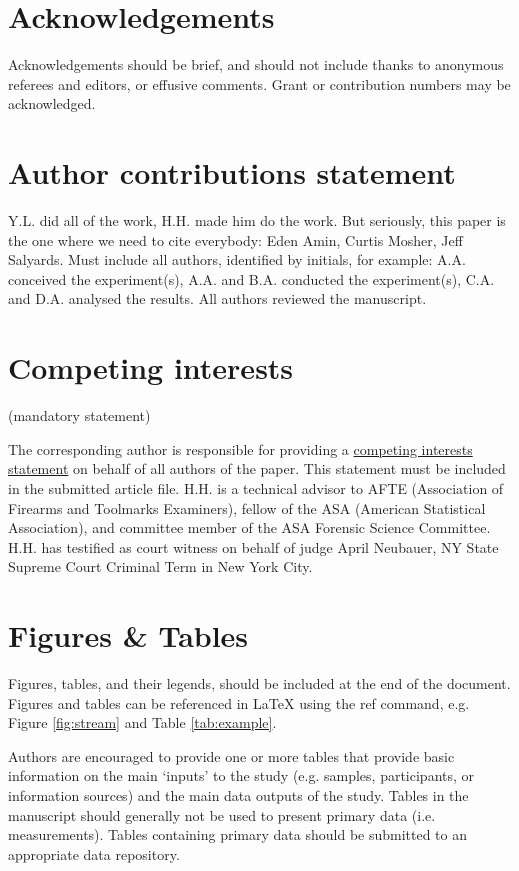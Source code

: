 \documentclass[fleqn,10pt]{wlscirep}
\begin{document}
\section*{Acknowledgements} 
Acknowledgements should be brief, and should not include thanks to
anonymous referees and editors, or effusive comments. Grant or
contribution numbers may be acknowledged.

\section*{Author contributions statement}

Y.L. did all of the work, H.H. made him do the work. But seriously, this
paper is the one where we need to cite everybody: Eden Amin, Curtis
Mosher, Jeff Salyards.
Must include all authors, identified by initials, for example:
A.A. conceived the experiment(s), A.A. and B.A. conducted the experiment(s), C.A. and D.A. analysed the results. All authors reviewed the manuscript. 

\section*{Competing interests} (mandatory statement)

The corresponding author is responsible for providing a
\href{https://www.nature.com/sdata/policies/editorial-and-publishing-policies#competing}{competing interests statement}
on behalf of all authors of the paper. This statement must be included
in the submitted article file. H.H. is a technical advisor to AFTE
(Association of Firearms and Toolmarks Examiners), fellow of the ASA
(American Statistical Association), and committee member of the ASA
Forensic Science Committee. H.H. has testified as court witness on
behalf of judge April Neubauer, NY State Supreme Court Criminal Term in
New York City.

\section*{Figures \& Tables}


Figures, tables, and their legends, should be included at the end of the document. Figures and tables can be referenced in \LaTeX{} using the ref command, e.g. Figure \ref{fig:stream} and Table \ref{tab:example}. 

Authors are encouraged to provide one or more tables that provide basic information on the main ‘inputs’ to the study (e.g. samples, participants, or information sources) and the main data outputs of the study. Tables in the manuscript should generally not be used to present primary data (i.e. measurements). Tables containing primary data should be submitted to an appropriate data repository.
\end{document}
